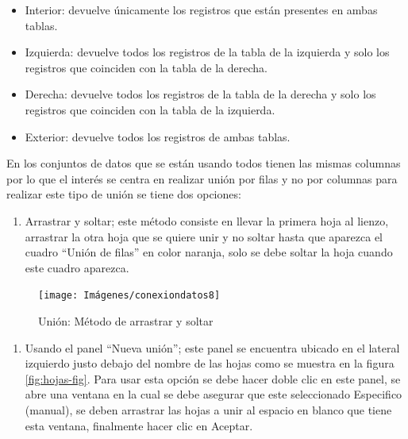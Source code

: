 \documentclass[
]{book}
\providecommand{\tightlist}{%
  \setlength{\itemsep}{0pt}\setlength{\parskip}{0pt}}
\begin{document}
\begin{itemize}
\item
  Interior: devuelve únicamente los registros que están presentes en ambas tablas.
\item
  Izquierda: devuelve todos los registros de la tabla de la izquierda y solo los registros que coinciden con la tabla de la derecha.
\item
  Derecha: devuelve todos los registros de la tabla de la derecha y solo los registros que coinciden con la tabla de la izquierda.
\item
  Exterior: devuelve todos los registros de ambas tablas.
\end{itemize}

En los conjuntos de datos que se están usando todos tienen las mismas columnas por lo que el interés se centra en realizar unión por filas y no por columnas para realizar este tipo de unión se tiene dos opciones:

\begin{enumerate}
\def\labelenumi{\arabic{enumi}.}
\tightlist
\item
  Arrastrar y soltar; este método consiste en llevar la primera hoja al lienzo, arrastrar la otra hoja que se quiere unir y no soltar hasta que aparezca el cuadro ``Unión de filas'' en color naranja, solo se debe soltar la hoja cuando este cuadro aparezca.
\end{enumerate}

\begin{figure}

{\centering \texttt{[image: Imágenes/conexiondatos8]} 

}

\caption{Unión: Método de arrastrar y soltar}\label{fig:unionarrastrar-fig}
\end{figure}

\begin{enumerate}
\def\labelenumi{\arabic{enumi}.}
\setcounter{enumi}{1}
\tightlist
\item
  Usando el panel ``Nueva unión''; este panel se encuentra ubicado en el lateral izquierdo justo debajo del nombre de las hojas como se muestra en la figura \ref{fig:hojas-fig}. Para usar esta opción se debe hacer doble clic en este panel, se abre una ventana en la cual se debe asegurar que este seleccionado Especifico (manual), se deben arrastrar las hojas a unir al espacio en blanco que tiene esta ventana, finalmente hacer clic en Aceptar.
\end{enumerate}
\end{document}
